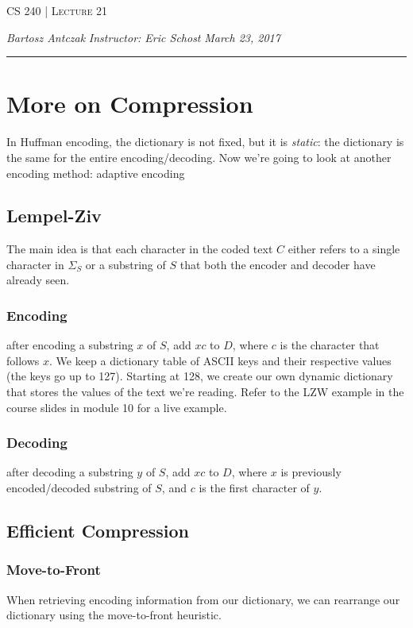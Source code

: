\documentclass{report}
\newcommand{\lectureNum}{21}
\newcommand{\curDate}{March 23, 2017}
\newcommand{\course}{CS 240}
\begin{document}
\begin{center}
\begin{Large}
\textsc{\course{} | Lecture \lectureNum{}}
\end{Large}
\end{center} 
\noindent \textit{Bartosz Antczak} \hfill
\textit{Instructor: Eric Schost} \hfill
\textit{\curDate{}}
\rule{\textwidth}{0.4pt}
\section{More on Compression}
In Huffman encoding, the dictionary is not fixed, but it is \textit{static}: the dictionary is the same for the entire encoding/decoding.
Now we're going to look at another encoding method: adaptive encoding
\subsection{Lempel-Ziv}
The main idea is that each character in the coded text $C$ either refers to a single character in $\Sigma_S$ or a substring of $S$ that both the encoder and decoder have already seen.
\subsubsection{Encoding}
after encoding a substring $x$ of $S$, add $xc$ to $D$, where $c$ is the character that follows $x$. We keep a dictionary table of ASCII keys and their respective values (the keys go up to 127). Starting at 128, we create our own dynamic dictionary that stores the values of the text we're reading. Refer to the LZW example in the course slides in module 10 for a live example.
\subsubsection{Decoding}
after decoding a substring $y$ of $S$, add $xc$ to $D$, where $x$ is previously encoded/decoded substring of $S$, and $c$ is the first character of $y$.
\subsection{Efficient Compression}
\subsubsection{Move-to-Front}
When retrieving encoding information from our dictionary, we can rearrange our dictionary using the move-to-front heuristic.
\end{document}
